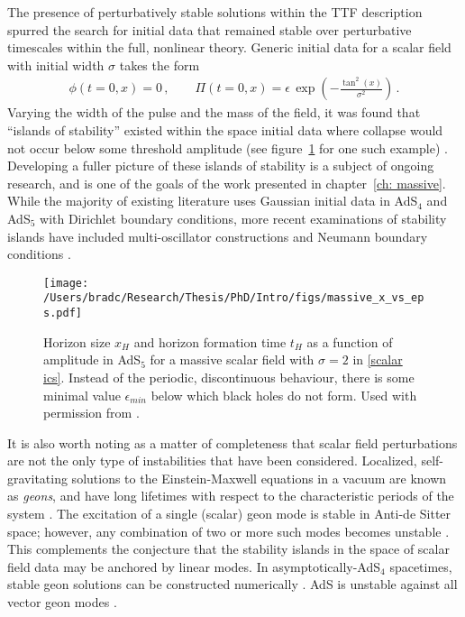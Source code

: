 \documentclass[../PhD.tex]{subfiles}
\begin{document}
The presence of perturbatively stable solutions within the TTF description spurred the search for initial data that remained stable over perturbative timescales within the full, nonlinear theory. Generic initial data for a scalar field with initial width $\sigma$ takes the form
\begin{align}
\label{scalar ics}
\phi(t=0, x) = 0 \, , \qquad \Pi(t=0, x) = \epsilon \, \exp \left( - \frac{ \tan^2 (x)}{\sigma^2} \right) \, .
\end{align}
Varying the width of the pulse and the mass of the field, it was found that ``islands of stability'' existed within the space initial data where collapse would not occur below some threshold amplitude (see figure~\ref{fig: massive x vs eps} for one such example) \cite{1508.02709, 1504.05203, 1711.00454, 1403.5434}. Developing a fuller picture of these islands of stability is a subject of ongoing research, and is one of the goals of the work presented in chapter~\ref{ch: massive}. While the majority of existing literature uses Gaussian initial data in AdS$_4$ and AdS$_5$ with Dirichlet boundary conditions, more recent examinations of stability islands have included multi-oscillator constructions and Neumann boundary conditions \cite{1803.02830, 1908.02296}.

\begin{figure}[h]
	\centering
	\texttt{[image: /Users/bradc/Research/Thesis/PhD/Intro/figs/massive\_x\_vs\_eps.pdf]}
	\caption[Horizon size and horizon formation time for a massive scalar]{Horizon size $x_H$ and horizon formation time $t_H$ as a function of amplitude in AdS$_5$ for a massive scalar field with $\sigma = 2$ in {\rm\eqref{scalar ics}}. Instead of the periodic, discontinuous behaviour, there is some minimal value $\epsilon_{min}$ below which black holes do not form. Used with permission from {\rm\cite{1508.02709}}.}
	\label{fig: massive x vs eps}
\end{figure}

It is also worth noting as a matter of completeness that scalar field perturbations are not the only type of instabilities that have been considered. Localized, self-gravitating solutions to the Einstein-Maxwell equations in a vacuum are known as \emph{geons}, and have long lifetimes with respect to the characteristic periods of the system \cite{Wheeler:1955zz}. The excitation of a single (scalar) geon mode is stable in Anti-de Sitter space; however, any combination of two or more such modes becomes unstable \cite{1109.1825}. This complements the conjecture that the stability islands in the space of scalar field data may be anchored by linear modes. In asymptotically-AdS$_4$ spacetimes, stable geon solutions can be constructed numerically \cite{1701.09100, 1701.07804}. AdS is unstable against all vector geon modes \cite{1408.5906}.
\end{document}
